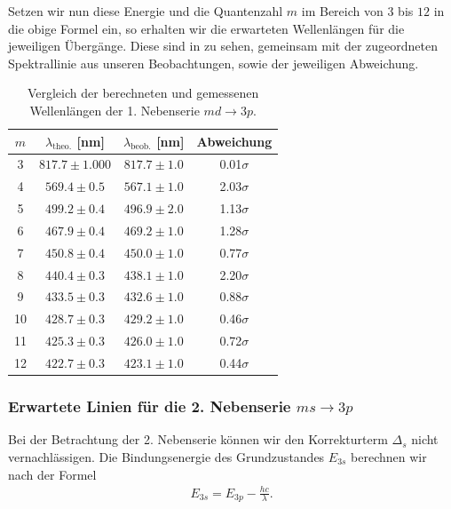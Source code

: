 Setzen wir nun diese Energie und die Quantenzahl $m$ im Bereich von $3$ bis $12$ in die obige Formel ein, so erhalten wir die erwarteten Wellenlängen für die jeweiligen Übergänge. Diese sind in  zu sehen, gemeinsam mit der zugeordneten Spektrallinie aus unseren Beobachtungen, sowie der jeweiligen Abweichung.

\begin{table}[H]
  \centering
  \caption{Vergleich der berechneten und gemessenen Wellenlängen der 1. Nebenserie $md \to 3p$.}
  \vspace*{0.5em}
  \begin{tabular}{c c c c}
      \hline
      $m$ & $\lambda_{\text{theo.}}$ [nm] & $\lambda_{\text{beob.}}$ [nm] & Abweichung \\
      \hline
      3  & $817.7 \pm 1.000$ & $817.7 \pm 1.0$ & 0.01$\sigma$ \\
      4  & $569.4 \pm 0.5$ & $567.1 \pm 1.0$ & 2.03$\sigma$ \\
      5  & $499.2 \pm 0.4$ & $496.9 \pm 2.0$ & 1.13$\sigma$ \\
      6  & $467.9 \pm 0.4$ & $469.2 \pm 1.0$ & 1.28$\sigma$ \\
      7  & $450.8 \pm 0.4$ & $450.0 \pm 1.0$ & 0.77$\sigma$ \\
      8  & $440.4 \pm 0.3$ & $438.1 \pm 1.0$ & 2.20$\sigma$ \\
      9  & $433.5 \pm 0.3$ & $432.6 \pm 1.0$ & 0.88$\sigma$ \\
      10 & $428.7 \pm 0.3$ & $429.2 \pm 1.0$ & 0.46$\sigma$ \\
      11 & $425.3 \pm 0.3$ & $426.0 \pm 1.0$ & 0.72$\sigma$ \\
      12 & $422.7 \pm 0.3$ & $423.1 \pm 1.0$ & 0.44$\sigma$ \\
      \hline
  \end{tabular}
  \label{tab:wellenlaengen_1ns}
\end{table}

\subsubsection*{Erwartete Linien für die 2. Nebenserie $ms \to 3p$}

Bei der Betrachtung der 2. Nebenserie können wir den Korrekturterm $\Delta_s$ nicht vernachlässigen. Die Bindungsenergie des Grundzustandes $E_{3s}$ berechnen wir nach der Formel
\begin{align}
  E_{3s} = E_{3p} - \frac{hc}{\lambda}.
\end{align}

